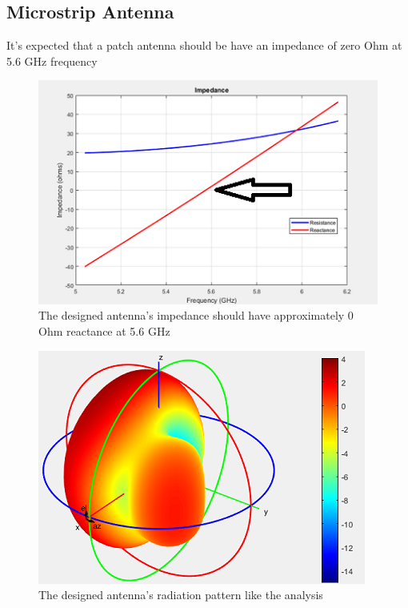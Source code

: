 \documentclass[11pt,a4paper,hidelinks]{article}
\begin{document}
    \subsection{Microstrip Antenna}
      \indent It's expected that a patch antenna should be have an impedance of zero Ohm at 5.6 GHz frequency
      \begin{figure}[ht]
        \includegraphics{Impedance.png}
        \centering
        \caption{The designed antenna's impedance should have approximately 0 Ohm reactance at 5.6 GHz}
      \end{figure}

      \begin{figure}[ht]
        \includegraphics{Radiation_pattern}
        \centering
        \caption{The designed antenna's radiation pattern like the analysis}
      \end{figure}

  \newpage
\end{document}
